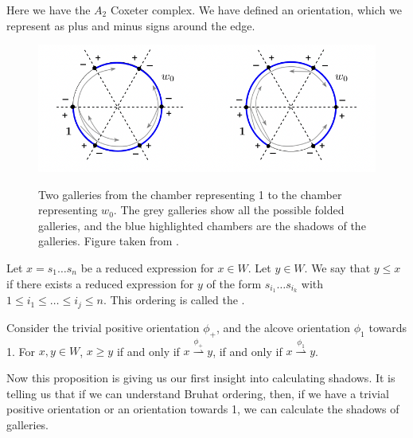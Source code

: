 \documentclass[11pt]{article}
\begin{document}
\begin{example}
    Here we have the $A_2$ Coxeter complex. We have defined an orientation, which we represent as plus and minus signs around the edge. 
\end{example}
\begin{figure}[!htbp]
    
    \begin{center}
    \includegraphics[scale=0.6]{Screenshot 2023-04-18 at 17.45.58.png}\\
    \end{center}
    \caption{Two galleries from the chamber representing 1 to the chamber representing $w_0$. The grey galleries show all the possible folded galleries, and the blue highlighted chambers are the shadows of the galleries. Figure taken from \cite[p.138]{SHA}. }
\end{figure}
\begin{definition}
    Let $x=s_1\hdots s_n$ be a reduced expression for $x\in W$. Let $y\in W$. We say that $y\leq x$ if there exists a reduced expression for $y$ of the form $s_{i_1}\hdots s_{i_k}$ with $1\leq i_1\leq\hdots \leq i_j\leq n$. This ordering is called the .
\end{definition}

\begin{proposition}
    Consider the trivial positive orientation $\phi_+$, and the alcove orientation $\phi_1$ towards 1. For $x,y\in W$, $x\geq y$ if and only if $x\stackrel{\phi_+}{\rightharpoonup} y$, if and only if $x\stackrel{\phi_1}{\rightharpoonup} y$.
\end{proposition}

Now this proposition is giving us our first insight into calculating shadows. It is telling us that if we can understand Bruhat ordering, then, if we have a trivial positive orientation or an orientation towards 1, we can calculate the shadows of galleries.
\end{document}
